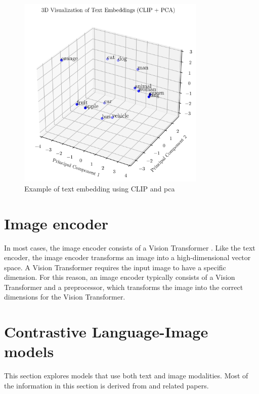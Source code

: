     \begin{figure}
        \centering
        \includegraphics[width = 0.8\textwidth]{Images/crossmodalnetworks/3DEmbedding.png}
        \caption{Example of text embedding using CLIP and \Acrshort{pca}}
        \label{fig:crossmodalnetworks:3demb}
    \end{figure}
    
    \section{Image encoder}

    In most cases, the image encoder consists of a Vision Transformer \cite{Vis_N_Grams}. 
    Like the text encoder, the image encoder transforms an image into a high-dimensional vector space. 
    A Vision Transformer requires the input image to have a specific dimension. 
    For this reason, an image encoder typically consists of a Vision Transformer and a preprocessor, which transforms the image into the correct dimensions for the Vision Transformer.


    \section{Contrastive Language-Image models
        \label{section:languageimagemodels}}
        This section explores models that use both text and image modalities. 
        Most of the information in this section is derived from \cite{cliplikeweb} and related papers.

